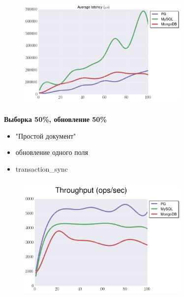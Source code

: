 \documentclass[usenames,dvipsnames, 18pt, compress, aspectratio=169]{beamer}
\begin{document}
\begin{frame}
    \frametitle{}
    \begin{center}
    \begin{figure}
        \includegraphics[width=0.75\textwidth,center]{benchmarks/insert_latency_99.png}
    \end{figure}
    \end{center}
\end{frame}

\begin{frame}
    \frametitle{}
    \begin{center}
        \textbf{Выборка 50\%, обновление 50\%}
        \begin{itemize}[label={}]
            \item "Простой документ"
            \item обновление одного поля
            \item transaction\_sync
        \end{itemize}
    \end{center}
\end{frame}

\begin{frame}
    \frametitle{}
    \begin{center}
    \begin{figure}
        \includegraphics[width=0.75\textwidth,center]{benchmarks/update_btree_transaction_sync_throughput.png}
    \end{figure}
    \end{center}
\end{frame}
\end{document}
